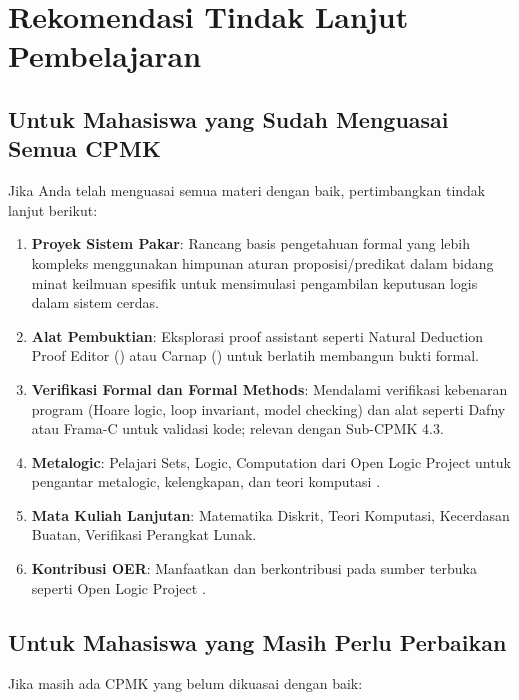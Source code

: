 \section{Rekomendasi Tindak Lanjut Pembelajaran}

\subsection{Untuk Mahasiswa yang Sudah Menguasai Semua CPMK}

Jika Anda telah menguasai semua materi dengan baik, pertimbangkan tindak lanjut berikut:

\begin{enumerate}
  \item \textbf{Proyek Sistem Pakar}: Rancang basis pengetahuan formal yang lebih kompleks menggunakan himpunan aturan proposisi/predikat dalam bidang minat keilmuan spesifik untuk mensimulasi pengambilan keputusan logis dalam sistem cerdas.
  \item \textbf{Alat Pembuktian}: Eksplorasi proof assistant seperti Natural Deduction Proof Editor (\cite{proofs_checker}) atau Carnap (\cite{carnap}) untuk berlatih membangun bukti formal.
  \item \textbf{Verifikasi Formal dan Formal Methods}: Mendalami verifikasi kebenaran program (Hoare logic, loop invariant, model checking) dan alat seperti Dafny atau Frama-C untuk validasi kode; relevan dengan Sub-CPMK 4.3.
  \item \textbf{Metalogic}: Pelajari Sets, Logic, Computation dari Open Logic Project untuk pengantar metalogic, kelengkapan, dan teori komputasi \cite{setslogic}.
  \item \textbf{Mata Kuliah Lanjutan}: Matematika Diskrit, Teori Komputasi, Kecerdasan Buatan, Verifikasi Perangkat Lunak.
  \item \textbf{Kontribusi OER}: Manfaatkan dan berkontribusi pada sumber terbuka seperti Open Logic Project \cite{openlogic}.
\end{enumerate}

\subsection{Untuk Mahasiswa yang Masih Perlu Perbaikan}

Jika masih ada CPMK yang belum dikuasai dengan baik:

